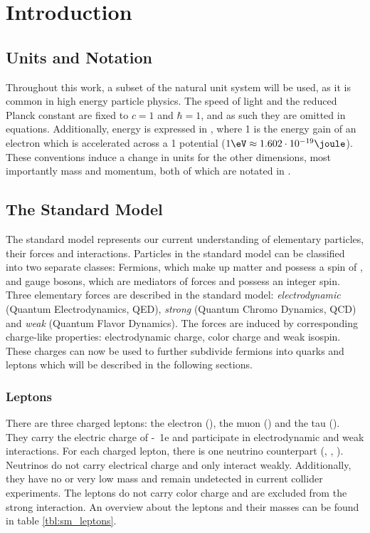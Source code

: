 \chapter{Introduction}

\section{Units and Notation}
Throughout this work, a subset of the natural unit system will be used, as it is common in high energy particle physics. The speed of light and the reduced Planck constant are fixed to $c = 1$ and $\hbar = 1$, and as such they are omitted in equations. Additionally, energy is expressed in \eV, where \unit{1}{\eV} is the energy gain of an electron which is accelerated across a \unit{1}{\volt} potential ($\unit{1}{\eV} \approx \unit{1.602 \e{-19}}{\joule}$). These conventions induce a change in units for the other dimensions, most importantly mass and momentum, both of which are notated in \GeV.

\section{The Standard Model}
The standard model represents our current understanding of elementary particles, their forces and interactions. 
Particles in the standard model can be classified into two separate classes: Fermions, which make up matter and possess a spin of , and gauge bosons, which are mediators of forces and possess an integer spin.
Three elementary forces are described in the standard model: \emph{electrodynamic} (Quantum Electrodynamics, QED), \emph{strong} (Quantum Chromo Dynamics, QCD) and \emph{weak} (Quantum Flavor Dynamics). The forces are induced by corresponding charge-like properties: electrodynamic charge, color charge and weak isospin. These charges can now be used to further subdivide fermions into quarks and leptons which will be described in the following sections.

\subsection{Leptons}
There are three charged leptons: the electron (\Pe), the muon (\Pmu) and the tau (\Ptau). They carry the electric charge of \unit{-1}{e} and participate in electrodynamic and weak interactions. For each charged lepton, there is one neutrino counterpart (\Pnue, \Pnum, \Pnut). Neutrinos do not carry electrical charge and only interact weakly. Additionally, they have no or very low mass and remain undetected in current collider experiments.
The leptons do not carry color charge and are excluded from the strong interaction.
An overview about the leptons and their masses can be found in table \ref{tbl:sm_leptons}.

